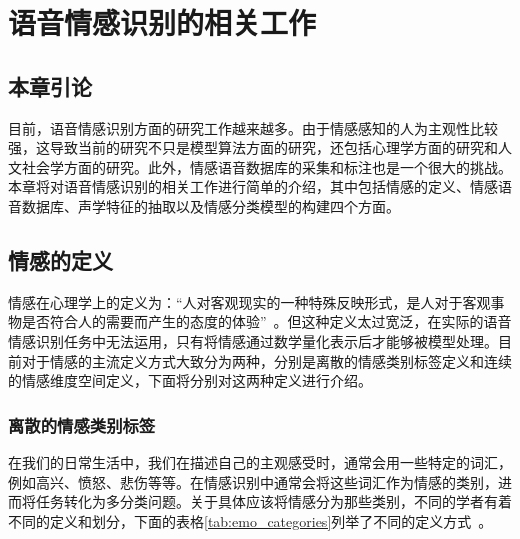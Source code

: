 \chapter{语音情感识别的相关工作}
\label{cha:basic_konwledge}

\section{本章引论}
\label{sec:basic_konwledge_intro}
目前，语音情感识别方面的研究工作越来越多。由于情感感知的人为主观性比较强，这导致当前的研究不只是模型算法方面的研究，还包括心理学方面的研究和人文社会学方面的研究。此外，情感语音数据库的采集和标注也是一个很大的挑战。本章将对语音情感识别的相关工作进行简单的介绍，其中包括情感的定义、情感语音数据库、声学特征的抽取以及情感分类模型的构建四个方面。

\section{情感的定义}
\label{sec:emo_def}
情感在心理学上的定义为：“人对客观现实的一种特殊反映形式，是人对于客观事物是否符合人的需要而产生的态度的体验”~\cite{Van1983Recognition}。但这种定义太过宽泛，在实际的语音情感识别任务中无法运用，只有将情感通过数学量化表示后才能够被模型处理。目前对于情感的主流定义方式大致分为两种，分别是离散的情感类别标签定义和连续的情感维度空间定义，下面将分别对这两种定义进行介绍。

\subsection{离散的情感类别标签}
\label{ssec:discrete_label}
在我们的日常生活中，我们在描述自己的主观感受时，通常会用一些特定的词汇，例如高兴、愤怒、悲伤等等。在情感识别中通常会将这些词汇作为情感的类别，进而将任务转化为多分类问题。关于具体应该将情感分为那些类别，不同的学者有着不同的定义和划分，下面的表格\ref{tab:emo_categories}列举了不同的定义方式~\cite{Ortony1990What, Robinson2013Handbook}。

